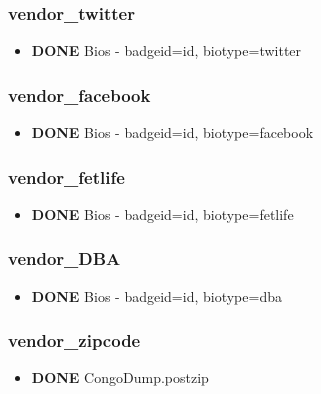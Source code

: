 \documentclass[captions=tablesignature]{scrartcl}
\begin{document}
\subsubsection{vendor\_twitter}
\label{sec-2-1-12}
\begin{itemize}
\item {\bfseries\sffamily DONE} Bios - badgeid=id, biotype=twitter
\label{sec-2-1-12-1}
\end{itemize}

\subsubsection{vendor\_facebook}
\label{sec-2-1-13}
\begin{itemize}
\item {\bfseries\sffamily DONE} Bios - badgeid=id, biotype=facebook
\label{sec-2-1-13-1}
\end{itemize}

\subsubsection{vendor\_fetlife}
\label{sec-2-1-14}
\begin{itemize}
\item {\bfseries\sffamily DONE} Bios - badgeid=id, biotype=fetlife
\label{sec-2-1-14-1}
\end{itemize}

\subsubsection{vendor\_DBA}
\label{sec-2-1-15}
\begin{itemize}
\item {\bfseries\sffamily DONE} Bios - badgeid=id, biotype=dba
\label{sec-2-1-15-1}
\end{itemize}

\subsubsection{vendor\_zipcode}
\label{sec-2-1-16}
\begin{itemize}
\item {\bfseries\sffamily DONE} CongoDump.postzip
\label{sec-2-1-16-1}
\end{itemize}
\end{document}
